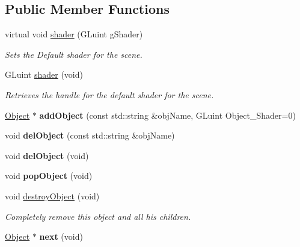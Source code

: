 \subsection*{Public Member Functions}
\begin{DoxyCompactItemize}
\item 
virtual void \hyperlink{class_scene_a3ea7e92935755c776c235a9872f53394}{shader} (G\-Luint g\-Shader)
\begin{DoxyCompactList}\small\item\em Sets the Default shader for the scene. \end{DoxyCompactList}\item 
G\-Luint \hyperlink{class_scene_a9d8a33f0f0a296aba0fb6717ab85cb18}{shader} (void)
\begin{DoxyCompactList}\small\item\em Retrieves the handle for the default shader for the scene. \end{DoxyCompactList}\item 
\hypertarget{class_scene_aa5a48614e959c38c35d824fa9d6a4b8b}{\hyperlink{class_object}{Object} $\ast$ {\bfseries add\-Object} (const std\-::string \&obj\-Name, G\-Luint Object\-\_\-\-Shader=0)}\label{class_scene_aa5a48614e959c38c35d824fa9d6a4b8b}

\item 
\hypertarget{class_scene_a2a6845dacbb468c5c097c7a6ab5a0fe0}{void {\bfseries del\-Object} (const std\-::string \&obj\-Name)}\label{class_scene_a2a6845dacbb468c5c097c7a6ab5a0fe0}

\item 
\hypertarget{class_scene_a2e6b319b60e27e66ad43bb942a6c4424}{void {\bfseries del\-Object} (void)}\label{class_scene_a2e6b319b60e27e66ad43bb942a6c4424}

\item 
\hypertarget{class_scene_ad6c9d1d1d0c786d39bf97dc60410e28b}{void {\bfseries pop\-Object} (void)}\label{class_scene_ad6c9d1d1d0c786d39bf97dc60410e28b}

\item 
\hypertarget{class_scene_a8c57e1cebc39586c7928225d1e25de39}{void \hyperlink{class_scene_a8c57e1cebc39586c7928225d1e25de39}{destroy\-Object} (void)}\label{class_scene_a8c57e1cebc39586c7928225d1e25de39}

\begin{DoxyCompactList}\small\item\em Completely remove this object and all his children. \end{DoxyCompactList}\item 
\hypertarget{class_scene_a70fcdad192a4c6ff508125de8af6cf4d}{\hyperlink{class_object}{Object} $\ast$ {\bfseries next} (void)}\label{class_scene_a70fcdad192a4c6ff508125de8af6cf4d}


\end{DoxyCompactItemize}
